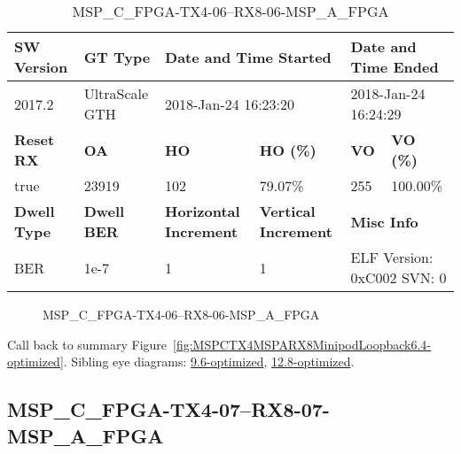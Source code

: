 \begin{table}[h]
\centering
\caption{MSP\_C\_FPGA-TX4-06--RX8-06-MSP\_A\_FPGA}
\label{tab:MSPCFPGATX406RX806MSPAFPGA6.4-optimized}
\begin{tabular}{@{}|l|l|l|l|l|l|@{}}
\toprule
\textbf{SW Version}                & \textbf{GT Type}   & \multicolumn{2}{l|}{\textbf{Date and Time Started}}            & \multicolumn{2}{l|}{\textbf{Date and Time Ended}}        \\ \midrule
2017.2                       & UltraScale GTH          & \multicolumn{2}{l|}{2018-Jan-24 16:23:20}                   & \multicolumn{2}{l|}{2018-Jan-24 16:24:29}               \\ \midrule
\textbf{Reset RX}                  & \textbf{OA} & \textbf{HO}   & \textbf{HO (\%)} & \textbf{VO} & \textbf{VO (\%)} \\ \midrule
true & 23919        & 102          & 79.07\%        & 255        & 100.00\%       \\ \midrule
\textbf{Dwell Type}                & \textbf{Dwell BER} & \textbf{Horizontal Increment} & \textbf{Vertical Increment}    & \multicolumn{2}{l|}{\textbf{Misc Info}}                  \\ \midrule
BER                            & 1e-7        & 1        & 1           & \multicolumn{2}{l|}{ELF Version: 0xC002 SVN: 0}                         \\ \bottomrule
\end{tabular}
\end{table}

\begin{figure}[h]
\caption{MSP\_C\_FPGA-TX4-06--RX8-06-MSP\_A\_FPGA} \label{fig:MSPCFPGATX406RX806MSPAFPGA6.4-optimized}
\end{figure}

Call back to summary Figure~\ref{fig:MSPCTX4MSPARX8MinipodLoopback6.4-optimized}.
Sibling eye diagrams: \hyperref[sec:MSPCFPGATX406RX806MSPAFPGA9.6-optimized]{9.6-optimized}, \hyperref[sec:MSPCFPGATX406RX806MSPAFPGA12.8-optimized]{12.8-optimized}.

\clearpage
\newpage


\subsection{MSP\_C\_FPGA-TX4-07--RX8-07-MSP\_A\_FPGA}\label{sec:MSPCFPGATX407RX807MSPAFPGA6.4-optimized}

